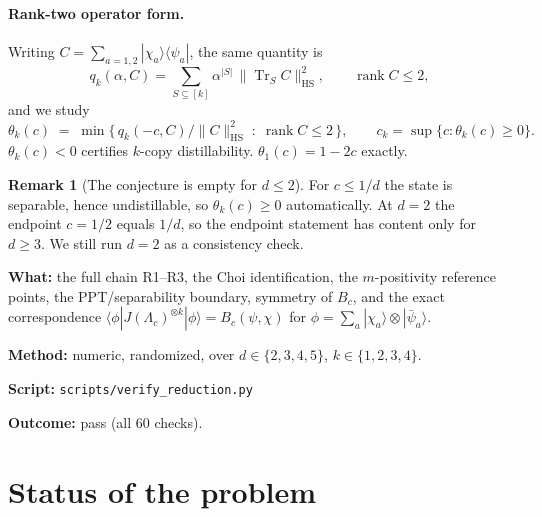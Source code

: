 \documentclass[11pt]{article}
\theoremstyle{definition}
\newtheorem{remark}{Remark}
\theoremstyle{plain}
\newcommand{\HS}{\mathrm{HS}}
\newcommand{\Tr}{\operatorname{Tr}}
\begin{document}
\paragraph{Rank-two operator form.} Writing $C=\sum_{a=1,2}|\chi_a\rangle\langle\psi_a|$,
the same quantity is
\[
q_k(\alpha,C)=\sum_{S\subseteq[k]}\alpha^{|S|}\,\|\Tr_S C\|_{\HS}^2,\qquad \operatorname{rank}C\le2 ,
\]
and we study
\[
\theta_k(c)\;=\;\min\Big\{\,q_k(-c,C)/\|C\|_{\HS}^2\;:\;\operatorname{rank}C\le 2\,\Big\},
\qquad
c_k=\sup\{c:\theta_k(c)\ge0\}.
\]
$\theta_k(c)<0$ certifies $k$-copy distillability. $\theta_1(c)=1-2c$ exactly.

\begin{remark}[The conjecture is empty for $d\le2$]
For $c\le1/d$ the state is separable, hence undistillable, so $\theta_k(c)\ge0$
automatically. At $d=2$ the endpoint $c=1/2$ equals $1/d$, so the endpoint statement has
content only for $d\ge3$. We still run $d=2$ as a consistency check.
\end{remark}

\begin{verification}
\textbf{What:} the full chain R1--R3, the Choi identification, the $m$-positivity
reference points, the PPT/separability boundary, symmetry of $B_c$, and the exact
correspondence $\langle\phi|J(\Lambda_c)^{\otimes k}|\phi\rangle=B_c(\psi,\chi)$ for
$\phi=\sum_a|\chi_a\rangle\otimes|\bar\psi_a\rangle$.

\textbf{Method:} numeric, randomized, over $d\in\{2,3,4,5\}$, $k\in\{1,2,3,4\}$.

\textbf{Script:} \texttt{scripts/verify\_reduction.py}

\textbf{Outcome:} pass (all 60 checks).
\end{verification}

\section{Status of the problem}
\end{document}
